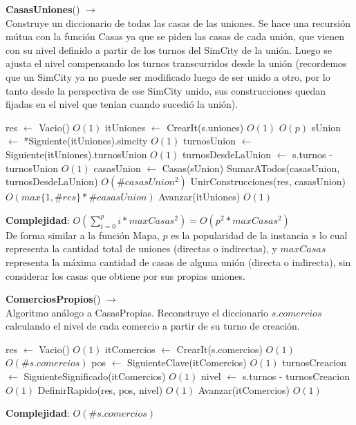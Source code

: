 \begin{Algoritmos}
\begin{algorithm}[H]{\textbf{CasasUniones}() $\to$ }
\\ {\small Construye un diccionario de todas las casas de las uniones. Se hace una recursión mútua con la función Casas ya que se piden las casas de cada unión, que vienen con su nivel definido a partir de los turnos del SimCity de la unión. Luego se ajusta el nivel compensando los turnos transcurridos desde la unión (recordemos que un SimCity ya no puede ser modificado luego de ser unido a otro, por lo tanto desde la perspectiva de ese SimCity unido, sus construcciones quedan fijadas en el nivel que tenían cuando sucedió la unión).}
\begin{algorithmic}[1]
    \State res $\gets$ Vacio() \Comment $O(1)$
    \State itUniones $\gets$ CrearIt(s.uniones) \Comment $O(1)$
     \Comment $O(p)$
        \State sUnion $\gets$ *Siguiente(itUniones).simcity \Comment $O(1)$
        \State turnosUnion $\gets$ Siguiente(itUniones).turnosUnion \Comment $O(1)$
        \State turnosDesdeLaUnion $\gets$ s.turnos - turnosUnion \Comment $O(1)$
        \State casasUnion $\gets$ Casas(sUnion)
        \State SumarATodos(casasUnion, turnosDesdeLaUnion) \Comment $O(\#casasUnion^2)$
        \State UnirConstrucciones(res, casasUnion) \Comment $O(max\{1, \#res\} * \#casasUnion)$
        \State Avanzar(itUniones) \Comment $O(1)$
    \EndWhile
\end{algorithmic}
\textbf{Complejidad}: $O( \sum_{i=0}^p i * maxCasas^2 ) = O( p^2 * maxCasas^2 )$ \\
De forma similar a la función Mapa, $p$ es la popularidad de la instancia $s$ lo cual representa la cantidad total de uniones (directas o indirectas), y $maxCasas$ representa la máxima cantidad de casas de alguna unión (directa o indirecta), sin considerar los casas que obtiene por sus propias uniones.
\end{algorithm}

\begin{algorithm}[H]{\textbf{ComerciosPropios}() $\to$ }
\\ {\small Algoritmo análogo a CasasPropias. Reconstruye el diccionario $s.comercios$ calculando el nivel de cada comercio a partir de su turno de creación.}
\begin{algorithmic}[1]
    \State res $\gets$ Vacio() \Comment $O(1)$
    \State itComercios $\gets$ CrearIt(s.comercios) \Comment $O(1)$
     \Comment $O(\#s.comercios)$
        \State pos $\gets$ SiguienteClave(itComercios) \Comment $O(1)$
        \State turnosCreacion $\gets$ SiguienteSignificado(itComercios) \Comment $O(1)$
        \State nivel $\gets$ s.turnos - turnosCreacion \Comment $O(1)$
        \State DefinirRapido(res, pos, nivel) \Comment $O(1)$
        \State Avanzar(itComercios) \Comment $O(1)$
    \EndWhile
\end{algorithmic}
\textbf{Complejidad}: $O(\#s.comercios)$
\end{algorithm}


\end{Algoritmos}
